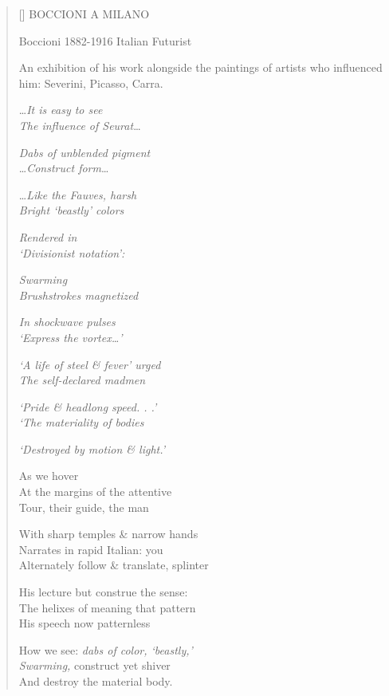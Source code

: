 \label{ch:milano_commune_di_milano}
\settowidth{\versewidth}{An exhibition of his work alongside the paintings of artists who influenced him: Severini, Picasso, Carra.}
\begin{verse}[\versewidth]
BOCCIONI A MILANO

Boccioni 1882-1916  Italian Futurist

An exhibition of his work alongside the paintings of artists who influenced him: Severini, Picasso, Carra.

\ldots \textit{It is easy to see\\
The influence of Seurat}\ldots

\textit{Dabs of unblended pigment}\\
\ldots \textit{Construct form}\ldots

\ldots \textit{Like the Fauves, harsh\\
Bright `beastly' colors}

\textit{Rendered in\\
`Divisionist notation':}

\textit{Swarming\\
Brushstrokes magnetized}

\textit{In shockwave pulses\\
`Express the vortex\ldots'}

\textit{`A life of steel \& fever' urged\\
The self-declared madmen}

\textit{`Pride \& headlong speed. . .'\\
`The materiality of bodies}

\textit{`Destroyed by motion \& light.'}

\hspace*{3\vgap} As we hover\\
At the margins of the attentive\\
Tour, their guide, the man

With sharp temples \& narrow hands\\
Narrates in rapid Italian: \qquad you\\
Alternately follow \& translate, splinter

His lecture but construe the sense:\\
The helixes of meaning that pattern\\
His speech now patternless

How we see: \textit{dabs of color, `beastly,'\\
Swarming,} \qquad construct \qquad yet shiver\\
And destroy the material body.
\end{verse}
